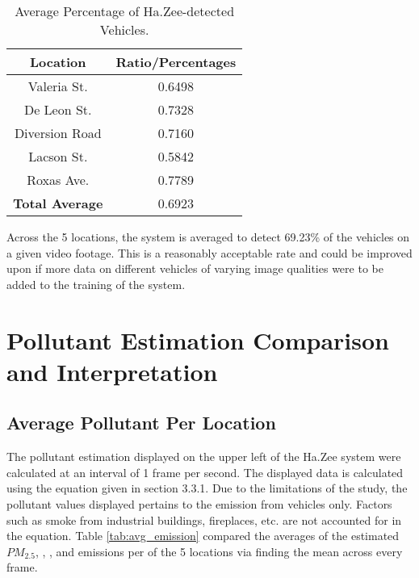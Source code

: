 \begin{table}[ht]   %
	\centering
	\caption{Average Percentage of Ha.Zee-detected Vehicles.} \vspace{0.25em}
	\begin{tabular}{c|c} \hline
		\centering \textbf {Location} & \textbf {Ratio/Percentages} \\ \hline
		Valeria St. & 0.6498 \\
		De Leon St. & 0.7328 	\\ 
		Diversion Road& 0.7160   \\ 
		Lacson St.   & 0.5842  \\ 
		Roxas Ave.  & 0.7789 \\ \hline
		
		\textbf{Total Average} & 0.6923 \\ \hline
		
	\end{tabular}
	\label{tab:avg_perc}
\end{table}


Across the 5 locations, the system is averaged to detect 69.23\% of the vehicles on a given video footage. This is a reasonably acceptable rate and could be improved upon if more data on different vehicles of varying image qualities were to be added to the training of the system.

\section{Pollutant Estimation Comparison and Interpretation}

\subsection{Average Pollutant Per Location}
The pollutant estimation displayed on the upper left of the Ha.Zee system were calculated at an interval of 1 frame per second. The displayed data is calculated using the equation given in section 3.3.1. Due to the limitations of the study, the pollutant values displayed pertains to the emission from vehicles only. Factors such as smoke from industrial buildings, fireplaces, etc. are not accounted for in the equation. Table \ref{tab:avg_emission} compared the averages of the estimated $PM_{2.5}$, , , and  emissions per of the 5 locations via finding the mean across every frame.

